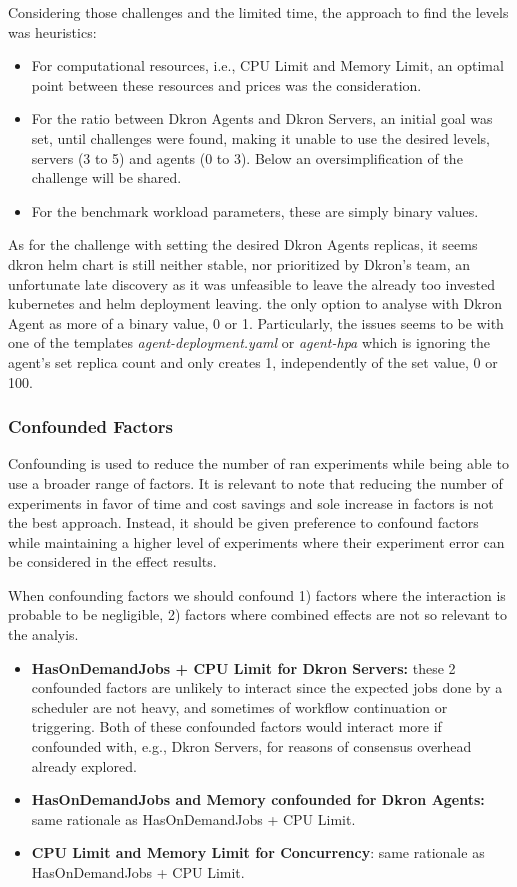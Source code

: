 \documentclass[runningheads]{llncs}
\begin{document}
Considering those challenges and the limited time, the approach to find the levels was heuristics:
\begin{itemize}
    \item For computational resources, i.e., CPU Limit and Memory Limit, an optimal point between
    these resources and prices was the consideration.
    \item For the ratio between Dkron Agents and Dkron Servers, an initial goal was set, until
    challenges were found, making it unable to use the desired levels, servers (3 to 5) and agents (0 to 3).
    Below an oversimplification of the challenge will be shared.
    \item For the benchmark workload parameters, these are simply binary values.
\end{itemize}

As for the challenge with setting the desired Dkron Agents replicas, it seems dkron helm chart
is still neither stable, nor prioritized by Dkron's team, an unfortunate late discovery
as it was unfeasible to leave the already too invested kubernetes and helm deployment leaving.
the only option to analyse with Dkron Agent as more of a binary value, 0 or 1.
Particularly, the issues seems to be with one of the templates \textit{agent-deployment.yaml} or
\textit{agent-hpa} which is ignoring the agent's set replica count and only creates 1,
independently of the set value, 0 or 100.



\subsubsection{Confounded Factors}
Confounding is used to reduce the number of ran experiments while being able to use a broader range
of factors. It is relevant to note that reducing the number of experiments in favor of time and cost savings
and sole increase in factors is not the best approach. Instead, it should be given preference to confound
factors while maintaining a higher level of experiments where their experiment error can be considered
in the effect results.

When confounding factors we should confound 1) factors where the interaction is probable to be negligible,
2) factors where combined effects are not so relevant to the analyis.

\begin{itemize}
    \item \textbf{HasOnDemandJobs + CPU Limit for Dkron Servers:} these 2 confounded factors are unlikely to interact since the expected jobs done by
        a scheduler are not heavy, and sometimes of workflow continuation or triggering.
        Both of these confounded factors would interact more if confounded with, e.g., Dkron Servers,
        for reasons of consensus overhead already explored.
    \item \textbf{HasOnDemandJobs and Memory confounded for Dkron Agents:} same rationale as
    HasOnDemandJobs + CPU Limit.
    \item \textbf{CPU Limit and Memory Limit for Concurrency}: same rationale as HasOnDemandJobs
    + CPU Limit.
\end{itemize}
\end{document}
